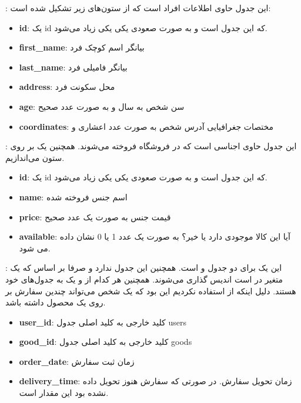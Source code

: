 :
این جدول حاوی اطلاعات افراد است که از ستون‌های زیر تشکیل شده است:
\begin{itemize}
    \item \textbf{id}: یک id که  این جدول است و به صورت صعودی یکی یکی زیاد می‌شود.
    \item \textbf{first\_name}: بیانگر اسم کوچک فرد
    \item \textbf{last\_name}: بیانگر فامیلی فرد
    \item \textbf{address}: محل سکونت فرد
    \item \textbf{age}: سن شخص به سال و به صورت عدد صحیح
    \item \textbf{coordinates}: مختصات جغرافیایی آدرس شخص به صورت عدد اعشاری و 
\end{itemize}
:
این جدول حاوی اجناسی است که در فروشگاه فروخته می‌شوند. همچنین یک
بر روی ستون
می‌اندازیم.
\begin{itemize}
    \item \textbf{id}: یک id که  این جدول است و به صورت صعودی یکی یکی زیاد می‌شود.
    \item \textbf{name}: اسم جنس فروخته شده
    \item \textbf{price}: قیمت جنس به صورت یک عدد صحیح
    \item \textbf{available}: آیا این کالا موجودی دارد یا خیر؟ به صورت یک عدد 1 یا 0 نشان داده می شود.
\end{itemize}
:
این یک
برای دو جدول
 و 
است. همچنین این جدول
ندارد و صرفا بر اساس
که یک متغیر
 در 
است اندیس گذاری می‌شوند. همچنین هر کدام از
 و 
یک
به جدول‌های خود هستند. دلیل اینکه از
استفاده نکردیم این بود که یک شخص می‌تواند چندین سفارش بر روی یک محصول داشته باشد.
\begin{itemize}
    \item \textbf{user\_id}: کلید خارجی به کلید اصلی جدول users
    \item \textbf{good\_id}: کلید خارجی به کلید اصلی جدول goods
    \item \textbf{order\_date}: زمان ثبت سفارش
    \item \textbf{delivery\_time}: زمان تحویل سفارش. در صورتی که سفارش هنوز تحویل داده نشده بود این مقدار  است.
\end{itemize}
